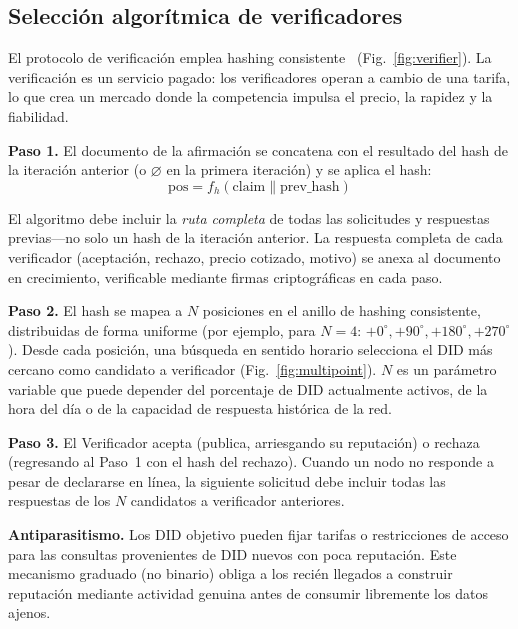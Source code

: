 \documentclass[11pt,a4paper,twocolumn]{article}
\begin{document}
\subsection{Selección algorítmica de verificadores}

El protocolo de verificación emplea hashing consistente~\cite{karger1997} (Fig.~\ref{fig:verifier}). La verificación es un servicio pagado: los verificadores operan a cambio de una tarifa, lo que crea un mercado donde la competencia impulsa el precio, la rapidez y la fiabilidad.

\textbf{Paso 1.} El documento de la afirmación se concatena con el resultado del hash de la iteración anterior (o $\varnothing$ en la primera iteración) y se aplica el hash:
\begin{equation}
\text{pos} = f_h(\text{claim} \| \text{prev\_hash})
\label{eq:hash}
\end{equation}

El algoritmo debe incluir la \emph{ruta completa} de todas las solicitudes y respuestas previas---no solo un hash de la iteración anterior. La respuesta completa de cada verificador (aceptación, rechazo, precio cotizado, motivo) se anexa al documento en crecimiento, verificable mediante firmas criptográficas en cada paso.

\textbf{Paso 2.} El hash se mapea a $N$ posiciones en el anillo de hashing consistente, distribuidas de forma uniforme (por ejemplo, para $N=4$: $+0^{\circ}, +90^{\circ}, +180^{\circ}, +270^{\circ}$). Desde cada posición, una búsqueda en sentido horario selecciona el DID más cercano como candidato a verificador (Fig.~\ref{fig:multipoint}). $N$ es un parámetro variable que puede depender del porcentaje de DID actualmente activos, de la hora del día o de la capacidad de respuesta histórica de la red.

\textbf{Paso 3.} El Verificador acepta (publica, arriesgando su reputación) o rechaza (regresando al Paso~1 con el hash del rechazo). Cuando un nodo no responde a pesar de declararse en línea, la siguiente solicitud debe incluir todas las respuestas de los $N$ candidatos a verificador anteriores.

\textbf{Antiparasitismo.} Los DID objetivo pueden fijar tarifas o restricciones de acceso para las consultas provenientes de DID nuevos con poca reputación. Este mecanismo graduado (no binario) obliga a los recién llegados a construir reputación mediante actividad genuina antes de consumir libremente los datos ajenos.
\end{document}
